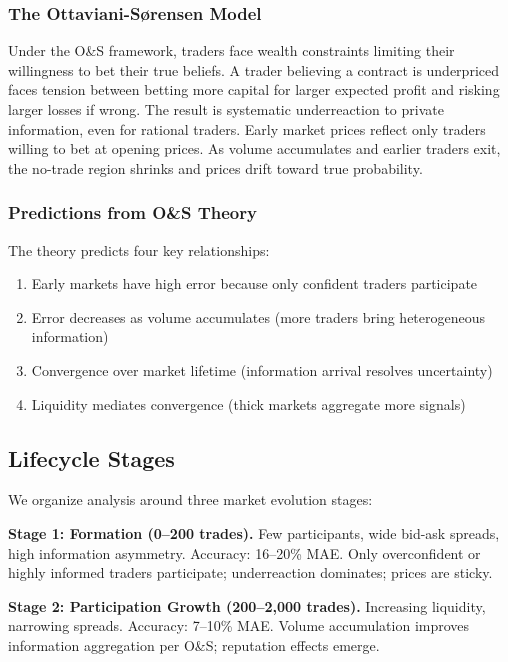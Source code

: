 \documentclass[a4paper,11pt]{article}
\theoremstyle{plain}
\theoremstyle{definition}
\begin{document}
\subsubsection{The Ottaviani-Sørensen Model}

Under the O&S framework, traders face wealth constraints limiting their willingness to bet their true beliefs. A trader believing a contract is underpriced faces tension between betting more capital for larger expected profit and risking larger losses if wrong. The result is systematic underreaction to private information, even for rational traders. Early market prices reflect only traders willing to bet at opening prices. As volume accumulates and earlier traders exit, the no-trade region shrinks and prices drift toward true probability.

\subsubsection{Predictions from O&S Theory}

The theory predicts four key relationships:

\begin{enumerate}
\item Early markets have high error because only confident traders participate
\item Error decreases as volume accumulates (more traders bring heterogeneous information)
\item Convergence over market lifetime (information arrival resolves uncertainty)
\item Liquidity mediates convergence (thick markets aggregate more signals)
\end{enumerate}

\subsection{Lifecycle Stages}

We organize analysis around three market evolution stages:

\textbf{Stage 1: Formation (0--200 trades).} Few participants, wide bid-ask spreads, high information asymmetry. Accuracy: 16--20\% MAE. Only overconfident or highly informed traders participate; underreaction dominates; prices are sticky.

\textbf{Stage 2: Participation Growth (200--2,000 trades).} Increasing liquidity, narrowing spreads. Accuracy: 7--10\% MAE. Volume accumulation improves information aggregation per O&S; reputation effects emerge.
\end{document}
